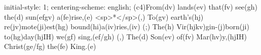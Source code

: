 initial-style: 1;
centering-scheme: english;
(c4)From(dv) lands(ev) that(fv) see(gh) the(d) sun(efgv) a(fe)rise,(e) <sp>*</sp>(,)
To(gv) earth's(hj) re(jv)mote(ji)est(hg) bound(hi)a(iv)ries,(iv) (;)
The(h) Vir(hjkv)gin-(j)born(ji) to(hg)day(hjIH) we(gf) sing,(ef/gh) (,)
The(d) Son(ev) of(fv) Mar(hv)y,(hjIH) Christ(ge/fg) the(fe) King.(e)
